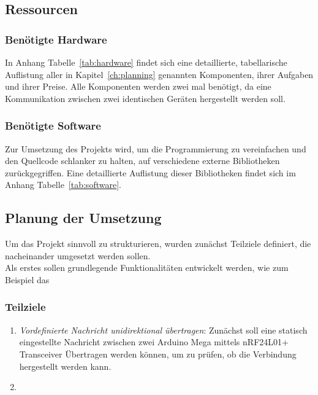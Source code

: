 \documentclass[a4paper, 11pt]{scrartcl}
\begin{document}
\subsection{Ressourcen}

\subsubsection{Benötigte Hardware}
In Anhang Tabelle~\ref{tab:hardware} findet sich eine detaillierte, tabellarische Auflistung aller in Kapitel~\ref{ch:planning} genannten Komponenten, ihrer Aufgaben und ihrer Preise.
Alle Komponenten werden zwei mal benötigt, da eine Kommunikation zwischen zwei identischen Geräten hergestellt werden soll.

\subsubsection{Benötigte Software}
Zur Umsetzung des Projekts wird, um die Programmierung zu vereinfachen und den Quellcode schlanker zu halten, auf verschiedene externe Bibliotheken zurückgegriffen.
Eine detaillierte Auflistung dieser Bibliotheken findet sich im Anhang Tabelle~\ref{tab:software}.

\subsection{Planung der Umsetzung}
Um das Projekt sinnvoll zu strukturieren, wurden zunächst Teilziele definiert, die nacheinander umgesetzt werden sollen.
\\
Als erstes sollen grundlegende Funktionalitäten entwickelt werden, wie zum Beispiel das  

\subsubsection{Teilziele}
\begin{enumerate}
    \item \textit{Vordefinierte Nachricht unidirektional übertragen}: Zunächst soll eine statisch eingestellte Nachricht zwischen zwei Arduino Mega mittels nRF24L01+ Transceiver
            Übertragen werden können, um zu prüfen, ob die Verbindung hergestellt werden kann.
    \item \textit{}
\end{enumerate}
\end{document}
